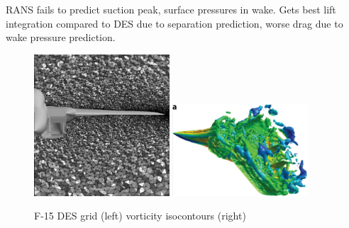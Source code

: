 \documentclass[journal]{new-aiaa}
\begin{document}
RANS fails to predict suction peak, surface pressures in wake.  Gets best lift integration compared to DES due to separation prediction, worse drag due to wake pressure prediction.













\begin{figure}[H]
\begin{center}
\includegraphics[width=0.45\textwidth]{Images/logan/forsythe2004detachededdy_f15grid.pdf}
\includegraphics[width=0.45\textwidth]{Images/logan/spalart2009detachededdy_f15des.pdf}
\caption{ F-15 DES grid (left) \cite{forsythe2004detachededdy} vorticity isocontours (right) \cite{spalart2009detachededdy} }
\label{fig:f15des}
\end{center}
\end{figure}
\end{document}
